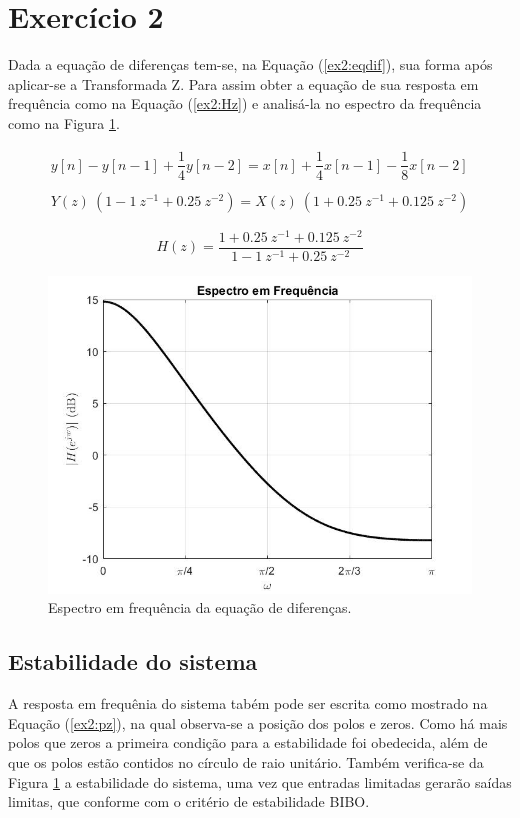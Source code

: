 \documentclass[a4paper,12pt,oneside,openany,table,xcdraw]{article}
\begin{document}
\vspace{0.5cm}
\section{Exercício 2}
Dada a equação de diferenças tem-se, na Equação (\ref{ex2:eqdif}), sua forma após aplicar-se a Transformada Z. Para assim obter a equação de sua resposta em frequência como na Equação (\ref{ex2:Hz}) e analisá-la no espectro da frequência como na Figura \ref{ex2:H}.

\begin{gather} 
y[n] - y[n-1] + \dfrac{1}{4} y[n-2] = x[n] +\dfrac{1}{4} x[n-1] -\dfrac{1}{8} x[n-2] \label{ex2:eqdif} \\
\\
Y(z)\ (1 - 1\ z^{-1} + 0.25\ z^{-2}) = X(z)\ (1 + 0.25\ z^{-1} + 0.125\ z^{-2})
\end{gather}

\begin{equation} \label{ex2:Hz}
H(z) = \dfrac{1 + 0.25\ z^{-1} + 0.125\ z^{-2}}{1 - 1\ z^{-1} + 0.25\ z^{-2}}
\end{equation}

\vspace{0.3cm}
\begin{figure}[H]
\centering
\includegraphics[width=13cm]{ex2-Hz}
\caption{Espectro em frequência da equação de diferenças.}
\label{ex2:H}
\end{figure}

\vspace{0.4cm}
\subsection{Estabilidade do sistema}
A resposta em frequênia do sistema tabém pode ser escrita como mostrado na Equação (\ref{ex2:pz}), na qual observa-se a posição dos polos e zeros. Como há mais polos que zeros a primeira condição para a estabilidade foi obedecida, além de que os polos estão contidos no círculo de raio unitário. Também verifica-se da Figura  \ref{ex2:H} a estabilidade do sistema, uma vez que entradas limitadas gerarão saídas limitas, que conforme com o critério de estabilidade BIBO.
\end{document}
